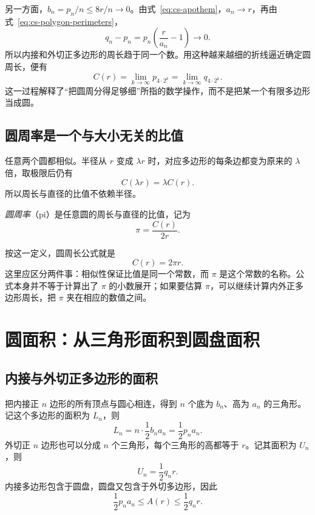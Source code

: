 \documentclass[UTF8,12pt,a4paper,fontset=fandol]{ctexart}
\begin{document}
另一方面，$b_n=p_n/n\leq8r/n\to0$。由式~\eqref{eq:cs-apothem}，$a_n\to r$，再由式~\eqref{eq:cs-polygon-perimeters}，
\[
  q_n-p_n=p_n\left(\frac{r}{a_n}-1\right)\longrightarrow0.
\]
所以内接和外切正多边形的周长趋于同一个数。用这种越来越细的折线逼近确定圆周长，便有
\begin{equation}\label{eq:cs-perimeter-limit}
  C(r)=\lim_{k\to\infty}p_{4\cdot2^k}
      =\lim_{k\to\infty}q_{4\cdot2^k}.
\end{equation}
这一过程解释了“把圆周分得足够细”所指的数学操作，而不是把某一个有限多边形当成圆。

\subsection{圆周率是一个与大小无关的比值}

任意两个圆都相似。半径从 $r$ 变成 $\lambda r$ 时，对应多边形的每条边都变为原来的 $\lambda$ 倍，取极限后仍有
\[
  C(\lambda r)=\lambda C(r).
\]
所以周长与直径的比值不依赖半径。

\begin{definition}[圆周率]
\emph{圆周率}（pi）是任意圆的周长与直径的比值，记为
\begin{equation}\label{eq:cs-pi-definition}
  \pi=\frac{C(r)}{2r}.
\end{equation}
\end{definition}

按这一定义，圆周长公式就是
\begin{equation}\label{eq:cs-circumference}
  \boxed{C(r)=2\pi r}.
\end{equation}
这里应区分两件事：相似性保证比值是同一个常数，而 $\pi$ 是这个常数的名称。公式本身并不等于计算出了 $\pi$ 的小数展开；如果要估算 $\pi$，可以继续计算内外正多边形周长，把 $\pi$ 夹在相应的数值之间。

\section{圆面积：从三角形面积到圆盘面积}
\label{sec:cs-circle-area}

\subsection{内接与外切正多边形的面积}

把内接正 $n$ 边形的所有顶点与圆心相连，得到 $n$ 个底为 $b_n$、高为 $a_n$ 的三角形。记这个多边形的面积为 $L_n$，则
\[
  L_n=n\cdot\frac12b_na_n=\frac12p_na_n.
\]
外切正 $n$ 边形也可以分成 $n$ 个三角形，每个三角形的高都等于 $r$。记其面积为 $U_n$，则
\[
  U_n=\frac12q_nr.
\]
内接多边形包含于圆盘，圆盘又包含于外切多边形，因此
\begin{equation}\label{eq:cs-area-squeeze}
  \frac12p_na_n\leq A(r)\leq\frac12q_nr.
\end{equation}
\end{document}

